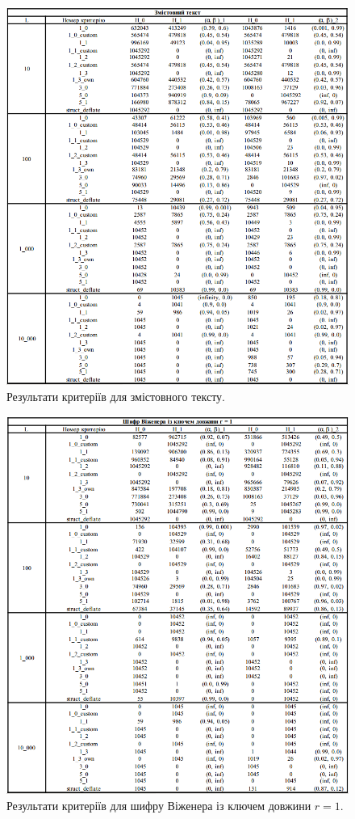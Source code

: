 \begin{figure}[!h]
    		\centering
    		\includegraphics[scale = 0.55]{Images/meaningfull_text.png}
    		\caption{Результати критеріїв для змістовного тексту.}
    		\label{fig:meanigfull_text}
	\end{figure}
 \begin{figure}[!h]
    		\centering
    		\includegraphics[scale = 0.55]{Images/vingenere_r1.png}
    		\caption{Результати критеріїв для шифру Віженера із ключем довжини $r = 1$.}
    		\label{fig:vingenere_r1}
	\end{figure}
